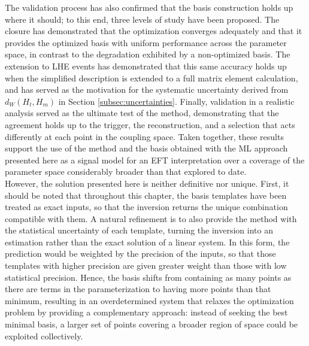 The validation process has also confirmed that the basis construction holds up where it should; to this end, three levels of study have been proposed. The closure has demonstrated that the optimization converges adequately and that it provides the optimized basis with uniform performance across the parameter space, in contrast to the degradation exhibited by a non-optimized basis. The extension to LHE events has demonstrated that this same accuracy holds up when the simplified description is extended to a full matrix element calculation, and has served as the motivation for the systematic uncertainty derived from $d_W(H_{t},H_{m})$ in Section \ref{subsec:uncertainties}. Finally, validation in a realistic analysis served as the ultimate test of the method, demonstrating that the agreement holds up to the trigger, the reconstruction, and a selection that acts differently at each point in the coupling space. Taken together, these results support the use of the method and the basis obtained with the ML approach presented here as a signal model for an EFT interpretation over a coverage of the parameter space considerably broader than that explored to date.\\


However, the solution presented here is neither definitive nor unique. First, it should be noted that throughout this chapter, the basis templates have been treated as exact inputs, so that the inversion returns the unique combination compatible with them. A natural refinement is to also provide the method with the statistical uncertainty of each template, turning the inversion into an estimation rather than the exact solution of a linear system. In this form, the prediction would be weighted by the precision of the inputs, so that those templates with higher precision are given greater weight than those with low statistical precision. Hence, the basis shifts from containing as many points as there are terms in the parameterization to having more points than that minimum, resulting in an overdetermined system that relaxes the optimization problem by providing a complementary approach: instead of seeking the best minimal basis, a larger set of points covering a broader region of space could be exploited collectively.

